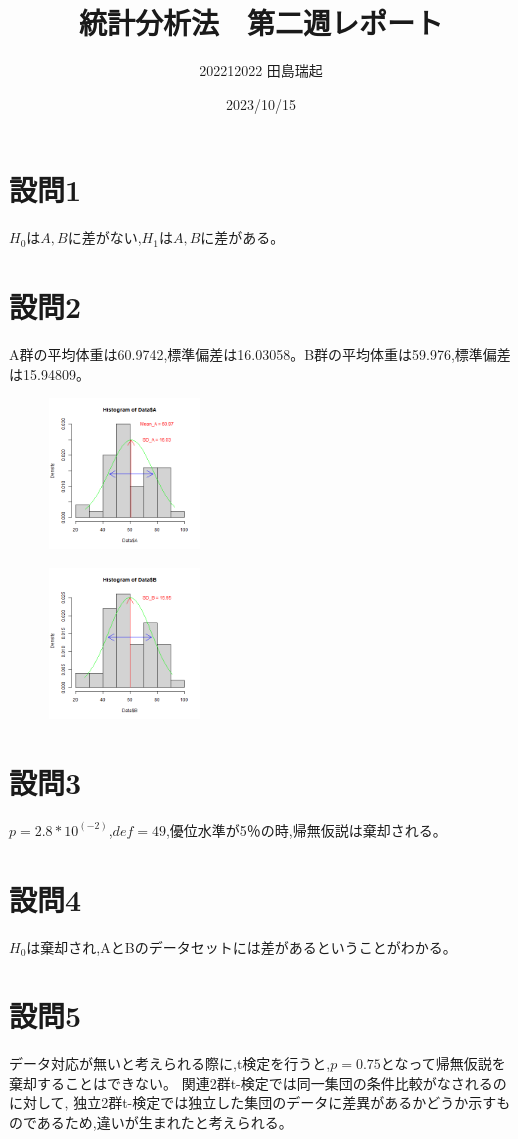 \documentclass[fontsize = 10pt, paper= a4,twocolumn,column_gap=5zw]{jlreq}
\begin{document}
\title{統計分析法　第二週レポート}
\author{202212022 田島瑞起}
\date{2023/10/15}
\maketitle
\section{設問1}
${H_0}$は$A,B$に差がない,${H_1}$は$A,B$に差がある。
\section{設問2}
A群の平均体重は60.9742,標準偏差は16.03058。B群の平均体重は59.976,標準偏差は15.94809。
\begin{figure}
    \centering
    \includegraphics[width=4cm]{3-2-1.png}
\end{figure}

\begin{figure}
    \centering
    \includegraphics[width=4cm]{3-2-2.png}
\end{figure}

\section{設問3}
$ p = 2.8*10^(-2) $,$ def = 49 $,優位水準が5％の時,帰無仮説は棄却される。

\section{設問4}
${H_0}$は棄却され,AとBのデータセットには差があるということがわかる。

\section{設問5}
データ対応が無いと考えられる際に,t検定を行うと,$p = 0.75$となって帰無仮説を棄却することはできない。
関連2群t-検定では同一集団の条件比較がなされるのに対して,
独立2群t-検定では独立した集団のデータに差異があるかどうか示すものであるため,違いが生まれたと考えられる。
\end{document}
